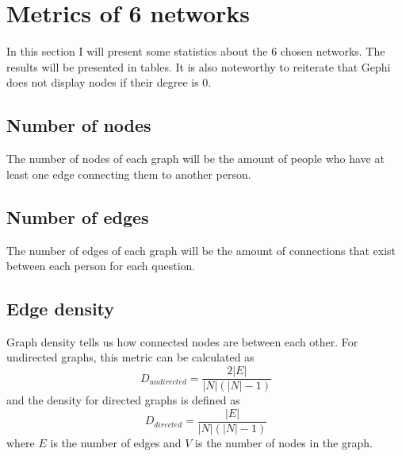 \section{Metrics of 6 networks}
In this section I will present some statistics about the 6 chosen networks. The results will be presented in tables. It is also noteworthy to reiterate that Gephi does not display nodes if their degree is 0.

\subsection{Number of nodes}
The number of nodes of each graph will be the amount of people who have at least one edge connecting them to another person.

\subsection{Number of edges}
The number of edges of each graph will be the amount of connections that exist between each person for each question.

\subsection{Edge density}
Graph density tells us how connected nodes are between each other. For undirected graphs, this metric can be calculated as
\begin{equation}
    D_{undirected} = \frac{2|E|}{|N|(|N|-1)}
    \label{equation:dir_density}
\end{equation}
and the density for directed graphs is defined as
\begin{equation}
    D_{directed} = \frac{|E|}{|N|(|N    |-1)}
    \label{equation:undir_density}
\end{equation}
where $E$ is the number of edges and $V$ is the number of nodes in the graph.

